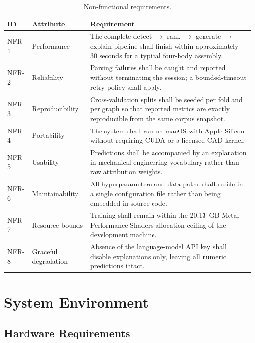 \documentclass[12pt,oneside,a4paper]{report}
\begin{document}
\begin{table}[h]
\centering
\caption{Non-functional requirements.}
\label{tab:nonfuncreq}
\small
\begin{tabularx}{\textwidth}{@{}C{1.4cm}L{2.9cm}X@{}}
\toprule
\textbf{ID} & \textbf{Attribute} & \textbf{Requirement} \\
\midrule
NFR-1 & Performance & The complete detect $\to$ rank $\to$ generate $\to$ explain pipeline shall finish within approximately 30 seconds for a typical four-body assembly. \\
NFR-2 & Reliability & Parsing failures shall be caught and reported without terminating the session; a bounded-timeout retry policy shall apply. \\
NFR-3 & Reproducibility & Cross-validation splits shall be seeded per fold and per graph so that reported metrics are exactly reproducible from the same corpus snapshot. \\
NFR-4 & Portability & The system shall run on macOS with Apple Silicon without requiring CUDA or a licensed CAD kernel. \\
NFR-5 & Usability & Predictions shall be accompanied by an explanation in mechanical-engineering vocabulary rather than raw attribution weights. \\
NFR-6 & Maintainability & All hyperparameters and data paths shall reside in a single configuration file rather than being embedded in source code. \\
NFR-7 & Resource bounds & Training shall remain within the 20.13~GB Metal Performance Shaders allocation ceiling of the development machine. \\
NFR-8 & Graceful degradation & Absence of the language-model API key shall disable explanations only, leaving all numeric predictions intact. \\
\bottomrule
\end{tabularx}
\end{table}

\section{System Environment}

\subsection{Hardware Requirements}
\end{document}
